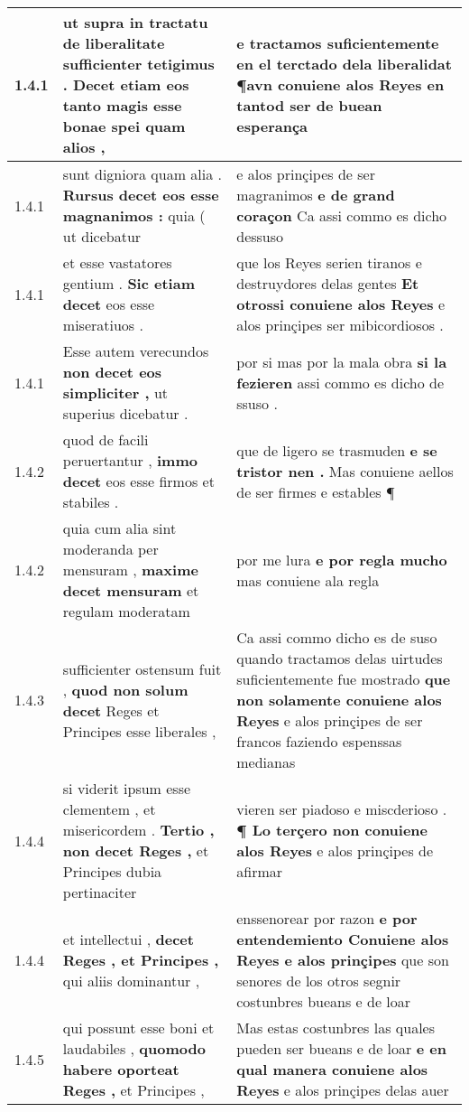 \begin{tabular}{|p{1cm}|p{6.5cm}|p{6.5cm}|}
1.4.1 & ut supra in tractatu de liberalitate sufficienter tetigimus . \textbf{ Decet etiam eos } tanto magis esse bonae spei quam alios , & e tractamos suficientemente en el terctado dela liberalidat \textbf{ ¶avn conuiene alos Reyes en } tantod ser de buean esperança \\\hline
1.4.1 & sunt digniora quam alia . \textbf{ Rursus decet eos esse magnanimos : } quia ( ut dicebatur & e alos prinçipes de ser magranimos \textbf{ e de grand coraçon } Ca assi commo es dicho dessuso \\\hline
1.4.1 & et esse vastatores gentium . \textbf{ Sic etiam decet } eos esse miseratiuos . & que los Reyes serien tiranos e destruydores delas gentes \textbf{ Et otrossi conuiene alos Reyes } e alos prinçipes ser mibicordiosos . \\\hline
1.4.1 & Esse autem verecundos \textbf{ non decet eos simpliciter , } ut superius dicebatur . & por si mas por la mala obra \textbf{ si la fezieren } assi commo es dicho de ssuso . \\\hline
1.4.2 & quod de facili peruertantur , \textbf{ immo decet } eos esse firmos et stabiles . & que de ligero se trasmuden \textbf{ e se tristor nen . } Mas conuiene aellos de ser firmes e estables ¶ \\\hline
1.4.2 & quia cum alia sint moderanda per mensuram , \textbf{ maxime decet mensuram } et regulam moderatam & por me lura \textbf{ e por regla mucho } mas conuiene ala regla \\\hline
1.4.3 & sufficienter ostensum fuit , \textbf{ quod non solum decet } Reges et Principes esse liberales , & Ca assi commo dicho es de suso quando tractamos delas uirtudes suficientemente fue mostrado \textbf{ que non solamente conuiene alos Reyes } e alos prinçipes de ser francos faziendo espenssas medianas \\\hline
1.4.4 & si viderit ipsum esse clementem , et misericordem . \textbf{ Tertio , non decet Reges , } et Principes dubia pertinaciter & vieren ser piadoso e miscderioso . \textbf{ ¶ Lo terçero non conuiene alos Reyes } e alos prinçipes de afirmar \\\hline
1.4.4 & et intellectui , \textbf{ decet Reges , et Principes , } qui aliis dominantur , & enssenorear por razon \textbf{ e por entendemiento Conuiene alos Reyes e alos prinçipes } que son senores de los otros segnir costunbres bueans e de loar \\\hline
1.4.5 & qui possunt esse boni et laudabiles , \textbf{ quomodo habere oporteat Reges , } et Principes , & Mas estas costunbres las quales pueden ser bueans e de loar \textbf{ e en qual manera conuiene alos Reyes } e alos prinçipes delas auer \\\hline

\end{tabular}
